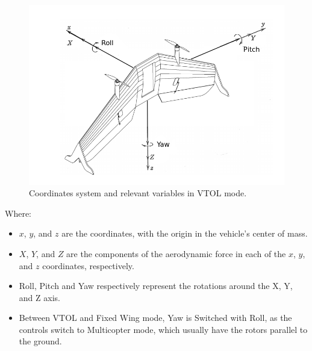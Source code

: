 \begin{figure}[h]
\centering
  \includegraphics[width=0.8\linewidth]{figs/axisvtol.png}
  \caption{Coordinates system and relevant variables in VTOL mode.}
  \label{fig:coords2}
\end{figure}

Where:


\begin{itemize}

\item $x$, $y$, and $z$ are the coordinates, with the origin in the vehicle's center of mass.
\item $X$, $Y$, and $Z$ are the components of the aerodynamic force in each of the $x$, $y$, and $z$ coordinates, respectively.
\item Roll, Pitch and Yaw respectively represent the rotations around the X, Y, and Z axis.
\item Between VTOL and Fixed Wing mode, Yaw is Switched with Roll, as the controls switch to Multicopter mode, which usually have the rotors parallel to the ground.


\end{itemize}

